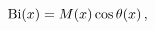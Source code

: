 \[\mathop{\mathrm{Bi}\/}\nolimits\!\left(x\right)=\mathop{M\/}\nolimits\!\left(x%
\right)\mathop{\cos\/}\nolimits\mathop{\theta\/}\nolimits\!\left(x\right),\]